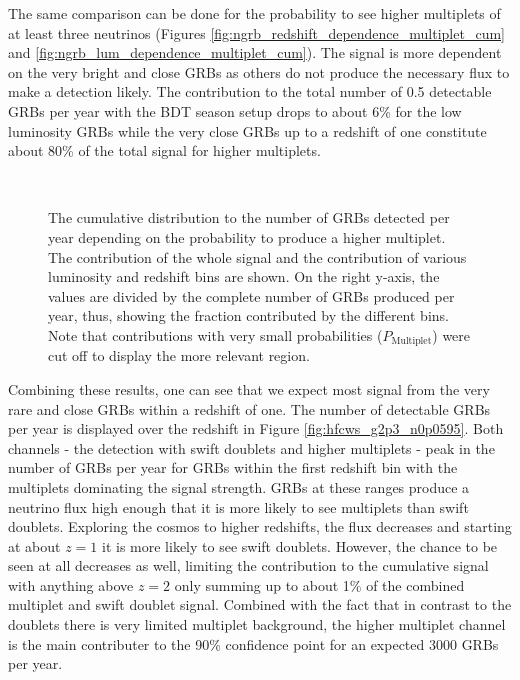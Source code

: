 The same comparison can be done for the probability to see higher multiplets 
of at least three neutrinos (Figures 
\ref{fig:ngrb_redshift_dependence_multiplet_cum} and 
\ref{fig:ngrb_lum_dependence_multiplet_cum}). The signal is more dependent on 
the very bright and close GRBs as others do not produce the necessary flux to 
make a detection likely. The contribution to the total number of 0.5 detectable 
GRBs per year with the BDT season setup drops to about 6\% for the low 
luminosity GRBs while the very close GRBs up to a redshift of one constitute 
about 80\% of the total signal for higher multiplets.


\begin{figure}[h]
\centering
 \captionsetup{width=.9\textwidth}
\\
\caption{The cumulative distribution to the number of GRBs detected 
per year depending on the probability to produce a higher multiplet. The 
contribution of the whole signal and the contribution of 
various luminosity and redshift bins are shown. On the right 
y-axis, the values are divided by the complete number of GRBs produced per 
year, thus, showing the fraction contributed by the different bins. Note that 
contributions with very small 
probabilities ($P_\mathrm{Multiplet}$) were cut off to display the more 
relevant region.}
\end{figure}


Combining these results, one can see that we expect most signal from the 
very rare and close GRBs within a redshift of one. The number of detectable 
GRBs per year is displayed over the redshift in Figure
\ref{fig:hfcws_g2p3_n0p0595}. Both channels - the detection with swift doublets 
and higher multiplets - peak in the number of GRBs per year for GRBs within the 
first redshift bin with the multiplets dominating the signal strength. GRBs at 
these ranges produce a neutrino flux high enough that it is more likely to see 
multiplets than swift doublets. Exploring the cosmos to higher redshifts, the 
flux decreases and starting at about $z=1$ it is more likely to see swift 
doublets. However, the chance to be seen at all decreases as well, limiting the 
contribution to the cumulative signal with anything above $z=2$ only summing up 
to about 1\% of the combined multiplet and swift doublet signal. Combined with 
the fact that in contrast to the doublets there is very limited multiplet 
background, the higher multiplet channel is the main contributer to the 90\% 
confidence point for an expected 3000 GRBs per year. 

